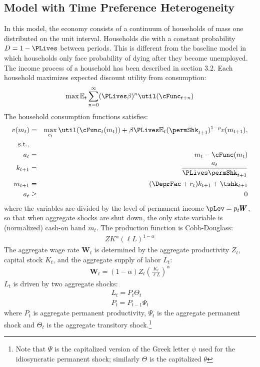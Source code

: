 \subsection{Model with Time Preference Heterogeneity}

In this model, the economy consists of a continuum of households of mass one distributed on the unit interval. Households die with a constant probability $D=1-\PLives$ between periods. This is different from the baseline model in which households only face probability of dying after they become unemployed. The income process of a household has been described in section 3.2. Each household maximizes expected discount utility from consumption:
\begin{eqnarray}
\max\mathbb{E}_{t}\sum_{n=0}^{\infty}(\PLives\beta)^{n}\util(\cFunc_{t+n})
\end{eqnarray}
The household consumption functions satisfies:
\begin{eqnarray}
v(m_{t}) & = & \max_{c_{t}} \util(\cFunc_{t}(m_{t}))+\beta\PLives\mathbb{E}_{t}(\permShk_{t+1})^{1-\rho}v(m_{t+1}), \label{eq:tran}
\\ \text{s.t.}, \nonumber
\\a_{t} & = & m_{t}-\cFunc(m_{t})
\\k_{t+1} & = & \frac{a_{t}}{\PLives \permShk_{t+1}}
\\m_{t+1} & = & (\DeprFac+r_{t})k_{t+1}+\tshk_{t+1}
\\a_{t} & \geq & 0
\end{eqnarray}
where the variables are divided by the level of permanent income $\pLev = p_{t}\pmb{W}$, so that
when aggregate shocks are shut down, the only state variable is (normalized) cash-on hand $m_{t}$.
The production function is Cobb-Douglass:
\begin{align}
ZK^{\alpha}(\ell L)^{1-\alpha}
\end{align}
The aggregate wage rate $\pmb{W}_{t}$ is determined by the aggregate productivity $Z_{t}$, capital stock $K_{t}$, and the aggregate supply of labor $L_{t}$:
\begin{align}
\pmb{W}_{t}=(1-\alpha)Z_{t}(\frac{K_{t}}{\ell L})^{\alpha}
\end{align}
$L_{t}$ is driven by two aggregate shocks:
\begin{align}
L_{t}=P_{t}\Theta_{t}
\\P_{t}=P_{t-1}\Psi_{t}
\end{align}
where $P_{t}$ is aggregate permanent productivity, 	$\Psi_{t}$ is the aggregate permanent shock
and $\Theta_{t}$ is the aggregate transitory shock.\footnote{Note that $\Psi$ is the capitalized version of the Greek letter $\psi$ used for the idiosyncratic permanent shock; similarly $\Theta$ is the capitalized $\theta$}

